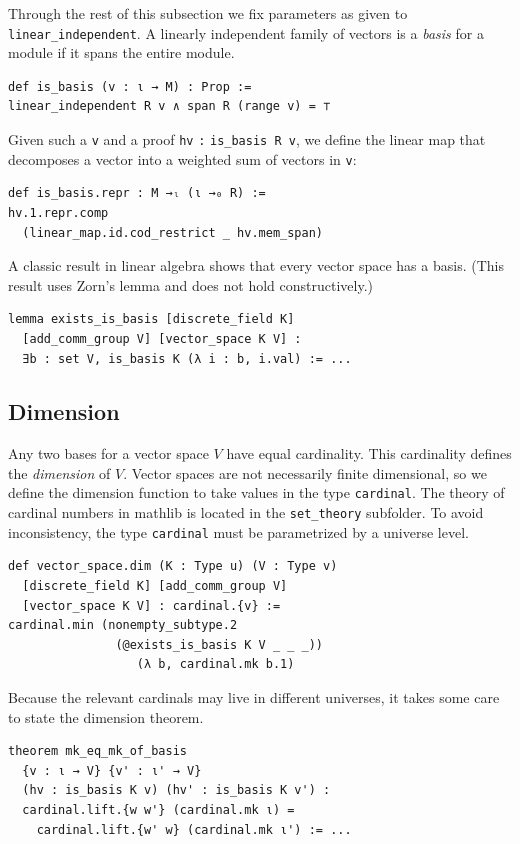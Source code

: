 \documentclass[sigplan]{acmart}\settopmatter{}
\newcommand{\mathlib}{\textsf{mathlib}\xspace}
\begin{document}
Through the rest of this subsection
we fix parameters as given to \lstinline{linear_independent}.
A linearly independent family of vectors is a \emph{basis} for a module
if it spans the entire module.

\begin{lstlisting}
def is_basis (v : ι → M) : Prop :=
linear_independent R v ∧ span R (range v) = ⊤
\end{lstlisting}

Given such a \lstinline{v} and a proof \lstinline{hv} \lstinline{:} \lstinline{is_basis R v},
we define the linear map that decomposes a vector into a weighted sum of vectors in \lstinline{v}:

\begin{lstlisting}
def is_basis.repr : M →ₗ (ι →₀ R) :=
hv.1.repr.comp
  (linear_map.id.cod_restrict _ hv.mem_span)
\end{lstlisting}

A classic result in linear algebra shows that every vector space has a basis.
(This result uses Zorn's lemma and does not hold constructively.)

\begin{lstlisting}
lemma exists_is_basis [discrete_field K]
  [add_comm_group V] [vector_space K V] :
  ∃b : set V, is_basis K (λ i : b, i.val) := ...
\end{lstlisting}

\subsection{Dimension}
\label{subsection:linalg:dimension}

Any two bases for a vector space $V$ have equal cardinality.
This cardinality defines the \emph{dimension} of $V$.
Vector spaces are not necessarily finite dimensional,
so we define the dimension function to take values in the type \lstinline{cardinal}.
The theory of cardinal numbers in \mathlib is located in the \lstinline{set_theory} subfolder.
To avoid inconsistency, the type \lstinline{cardinal} must be parametrized by a universe level.

\begin{lstlisting}
def vector_space.dim (K : Type u) (V : Type v)
  [discrete_field K] [add_comm_group V]
  [vector_space K V] : cardinal.{v} :=
cardinal.min (nonempty_subtype.2
   			   (@exists_is_basis K V _ _ _))
 			      (λ b, cardinal.mk b.1)
\end{lstlisting}

Because the relevant cardinals may live in different universes,
it takes some care to state the dimension theorem.
\begin{lstlisting}
theorem mk_eq_mk_of_basis
  {v : ι → V} {v' : ι' → V}
  (hv : is_basis K v) (hv' : is_basis K v') :
  cardinal.lift.{w w'} (cardinal.mk ι) =
    cardinal.lift.{w' w} (cardinal.mk ι') := ...
\end{lstlisting}
\end{document}
